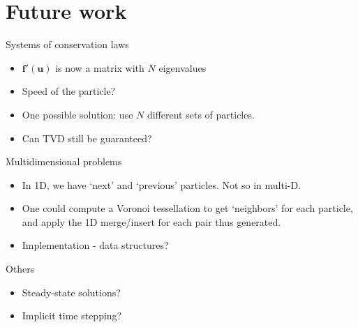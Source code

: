 \documentclass{beamer}
\let\bld\boldsymbol
\begin{document}
\section{Future work}

\begin{frame}{Systems of conservation laws}
\begin{itemize}
	\item $\bld{f}'(\bld{u})$ is now a matrix with $N$ eigenvalues
	\item Speed of the particle?
	\item One possible solution: use $N$ different sets of particles.
	\item Can TVD still be guaranteed?
\end{itemize}
\end{frame}

\begin{frame}{Multidimensional problems}
\begin{itemize}
	\item In 1D, we have `next' and `previous' particles. Not so in multi-D.
	\item One could compute a Voronoi tessellation to get `neighbors' for each particle, and apply the 1D merge/insert for each pair thus generated.
	\item Implementation - data structures?
\end{itemize}
\end{frame}

\begin{frame}{Others}
\begin{itemize}
	\item Steady-state solutions?
	\item Implicit time stepping?
\end{itemize}
\end{frame}

\printbibliography
\end{document}
